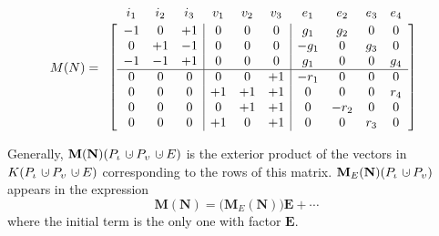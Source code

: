 \documentclass[12pt]{article}
\theoremstyle{definition}
\newcommand{\dunion}
{\mbox{\hbox{\hskip6pt$\cdot$\hskip-5.50pt$\cup$\hskip2pt}}}
\newcommand{\Is}{\ensuremath{\iota}}
\newcommand{\Vs}{\ensuremath{\upsilon}}
\newcommand{\FieldK}{\ensuremath{K}}
\newcommand{\ext}[1]{\ensuremath{\mathbf{#1}}}
\begin{document}
\[
M(N)=
\begin{array}{c}
\begin{array}{cccccccccc}
i_1 & i_2 & i_3 & v_1 & v_2 & v_3  & e_1  & e_2 & e_3 & e_4 \\[-1em]
\hphantom{+1}&\hphantom{+1}&\hphantom{+1}&
\hphantom{+1}&\hphantom{+1}&\hphantom{+1}&
\hphantom{+g_1}&\hphantom{-g_1}&\hphantom{g_3}&\hphantom{g_4}
\end{array}\\
\left[\begin{array}{ccc|ccc|cccc}
 -1 &  0  &  +1 &   0 &  0  &   0  & g_1  & g_2 &  0  & 0   \\ 
  0 & +1  &  -1 &   0 &  0  &   0  & -g_1 &   0 & g_3 & 0   \\ 
 -1 & -1  &  +1 &   0 &  0  &   0  & g_1  &   0 &  0  & g_4   \\ \hline
  0 &  0  &   0 &  0  &  0  &  +1  &-r_1  &   0 &  0  & 0 \\
  0 &  0  &   0 & +1  &  +1 &  +1  &   0  &   0 &  0  & r_4\\
  0 &  0  &   0 &  0  &  +1 &  +1  &   0  &-r_2 &  0  &  0\\
  0 &  0  &   0 & +1  &   0 &  +1  &   0  &   0 & r_3 &  0
\end{array}\right]
\end{array}
\]


Generally, $\ext{M}(\ext{N})(P_{\Is}\dunion P_{\Vs}\dunion E)$
is the exterior product of the vectors in
$\FieldK (P_{\Is}\dunion P_{\Vs}\dunion E)$ corresponding to the
rows of this matrix.
$\ext{M}_E(\ext{N})(P_{\Is}\dunion P_{\Vs})$ appears
in the expression
\[
\ext{M}(\ext{N})=\big(\ext{M}_E(\ext{N})\big)\ext{E} + \cdots
\]
where the initial term is the only one with factor $\ext{E}$.
\end{document}
